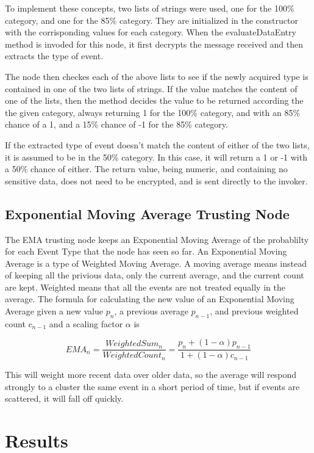 \documentclass[11pt]{article}
\begin{document}
To implement these concepts, two lists of strings were used, one for the 100\% category, and one for the 85\% category. They are initialized in the constructor with the corrisponding values for each category. When the evaluateDataEntry method is invoded for this node, it first decrypts the message received and then extracts the type of event.

The node then checkes each of the above lists to see if the newly acquired type is contained in one of the two lists of strings. If the value matches the content of one of the lists, then the method decides the value to be returned according the the given category, always returning 1 for the 100\% category, and with an 85\% chance of a 1, and a 15\% chance of -1 for the 85\% category.

If the extracted type of event doesn't match the content of either of the two lists, it is assumed to be in the 50\% category. In this case, it will return a 1 or -1 with a 50\% chance of either. The return value, being numeric, and containing no sensitive data, does not need to be encrypted, and is sent directly to the invoker.

\subsection{Exponential Moving Average Trusting Node}

The EMA trusting node keeps an Exponential Moving Average of the probablilty for each Event Type that the node has seen so far. An Exponential Moving Average is a type of Weighted Moving Average. A moving average means instead of keeping all the privious data, only the current average, and the current count are kept. Weighted means that all the events are not treated equally in the average. The formula for calculating the new value of an Exponential Moving Average given a new value \(p_n\), a previous average \(p_{n-1}\), and previous weighted count \(c_{n-1}\) and a scaling factor \(\alpha\) is

\[EMA_n = \frac{WeightedSum_n}{WeightedCount_n} = \frac{p_n + (1-\alpha)p_{n-1}}{1+(1-\alpha)c_{n-1}}\]

This will weight more recent data over older data, so the average will respond strongly to a cluster the same event in a short period of time, but if events are scattered, it will fall off quickly.

\section{Results}
\end{document}

